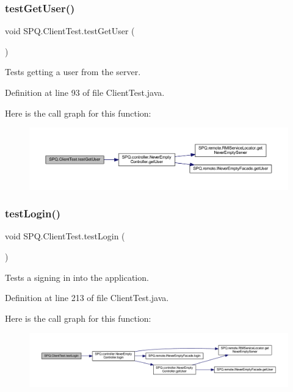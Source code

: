 \subsubsection{\texorpdfstring{test\+Get\+User()}{testGetUser()}}
{\footnotesize\ttfamily void S\+P\+Q.\+Client\+Test.\+test\+Get\+User (\begin{DoxyParamCaption}{ }\end{DoxyParamCaption})}

Tests getting a user from the server. 

Definition at line 93 of file Client\+Test.\+java.

Here is the call graph for this function\+:\nopagebreak
\begin{figure}[H]
\begin{center}
\leavevmode
\includegraphics[width=350pt]{class_s_p_q_1_1_client_test_a611b894c9d3826db1d2104e2aae23267_cgraph}
\end{center}
\end{figure}
\mbox{\label{class_s_p_q_1_1_client_test_a88728d2e3535750655d518d73f81e22b}} 
\subsubsection{\texorpdfstring{test\+Login()}{testLogin()}}
{\footnotesize\ttfamily void S\+P\+Q.\+Client\+Test.\+test\+Login (\begin{DoxyParamCaption}{ }\end{DoxyParamCaption})}

Tests a signing in into the application. 

Definition at line 213 of file Client\+Test.\+java.

Here is the call graph for this function\+:\nopagebreak
\begin{figure}[H]
\begin{center}
\leavevmode
\includegraphics[width=350pt]{class_s_p_q_1_1_client_test_a88728d2e3535750655d518d73f81e22b_cgraph}
\end{center}
\end{figure}
\mbox{\label{class_s_p_q_1_1_client_test_ac05d043ac92f1c1083d19eec58e5bbd9}} 
